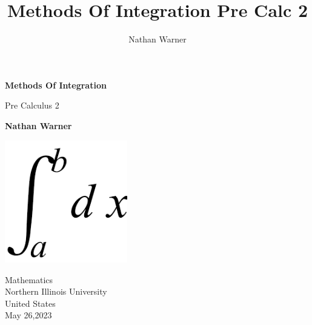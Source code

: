 \documentclass{report}
\title{\Huge{Methods Of Integration Pre Calc 2}}
\author{\huge{Nathan Warner}}
\date{\huge{}}
\begin{document}
    \begin{titlepage}
       \begin{center}
           \vspace*{1cm}
    
           \textbf{Methods Of Integration}
    
           \vspace{0.5cm}
            Pre Calculus 2
                
           \vspace{1.5cm}
    
           \textbf{Nathan Warner}
    
           \vfill
                
                
           \vspace{0.8cm}
         
           \includegraphics[width=0.4\textwidth]{./figures/int.png}
                
           Mathematics \\
           Northern Illinois University\\
           United States\\
           May 26,2023
                
       \end{center}
    \end{titlepage}
    
    \tableofcontents
    \pagebreak \bigbreak \noindent
    \bigbreak \noindent 
\end{document}
